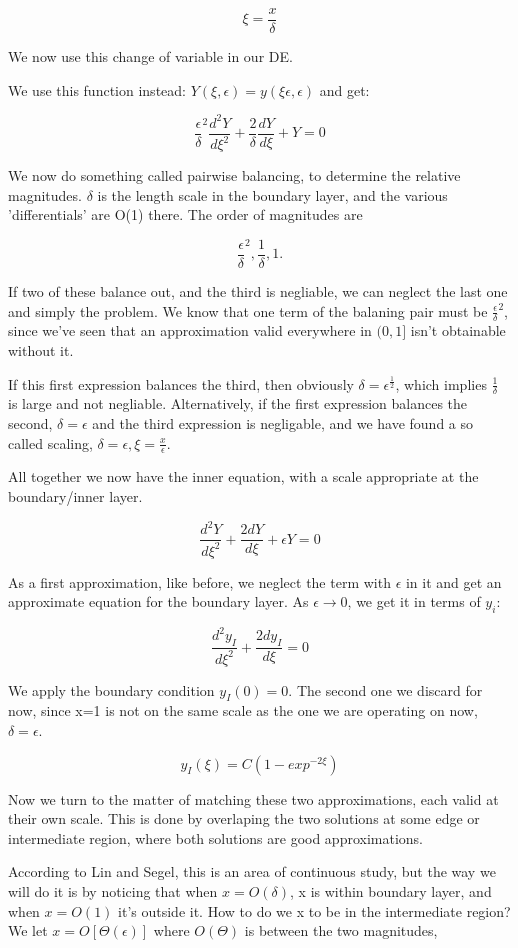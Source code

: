 \documentclass[12pt]{report}
\begin{document}
$$\xi = \frac x \delta$$

We now use this change of variable in our DE.

We use this function instead: $Y(\xi, \epsilon) = y(\xi \epsilon, \epsilon)$ and
get:

$$\frac \epsilon \delta^2 \frac{d^2Y}{d\xi^2} + \frac 2 \delta \frac{dY}{d\xi}
+ Y = 0$$

We now do something called pairwise balancing, to determine the relative
magnitudes. $\delta$ is the length scale in the boundary layer, and the various
'differentials' are O(1) there. The order of magnitudes are

$$\frac \epsilon \delta^2, \frac 1 \delta, 1.$$

If two of these balance out, and the third is negliable, we can neglect
the last one and simply the problem. We know that one term of the balaning pair
must be $\frac \epsilon \delta^2$, since we've seen that an approximation valid
everywhere in $(0,1]$ isn't obtainable without it.

If this first expression balances the third, then obviously $\delta =
\epsilon^{\frac 1 2}$, which implies $\frac 1 \delta$ is large and not
negliable. Alternatively, if the first expression balances the second, $\delta =
\epsilon$ and the third expression is negligable, and we have found a so called
scaling, $\delta = \epsilon, \xi=\frac x \epsilon$.

All together we now have the inner equation, with a scale appropriate at the
boundary/inner layer.

$$\frac{d^2Y}{d\xi^2} + \frac{2dY}{d\xi} + \epsilon Y = 0$$

As a first approximation, like before, we neglect the term with $\epsilon$ in it
and get an approximate equation for the boundary layer. As $\epsilon \to 0$, we
get it in terms of $y_i$:

$$\frac{d^2y_I}{d\xi^2} + \frac{2dy_I}{d\xi} = 0$$

We apply the boundary condition $y_I(0) = 0$. The second one we discard for now,
since x=1 is not on the same scale as the one we are operating on now,
$\delta=\epsilon$.

$$y_I(\xi) = C(1-exp^{-2\xi})$$

Now we turn to the matter of matching these two approximations, each valid at
their own scale. This is done by overlaping the two solutions at some edge or
intermediate region, where both solutions are good approximations.

According to Lin and Segel, this is an area of continuous study, but the way we
will do it is by noticing that when $x=O(\delta)$, x is within boundary layer,
and when $x=O(1)$ it's outside it. How to do we x to be in the intermediate
region? We let $x=O[\Theta(\epsilon)]$ where $O(\Theta)$ is between the two
magnitudes,
\end{document}
